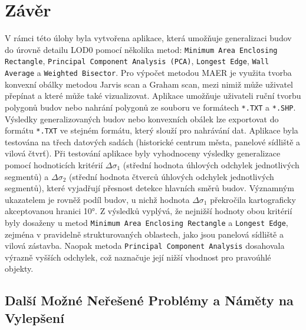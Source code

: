 \section{Závěr}

V rámci této úlohy byla vytvořena aplikace, která umožňuje generalizaci budov do úrovně detailu LOD0 pomocí několika metod: \texttt{Minimum Area Enclosing Rectangle}, \texttt{Principal Component Analysis (PCA)}, \texttt{Longest Edge}, \texttt{Wall Average} a \texttt{Weighted Bisector}. Pro výpočet metodou MAER je využita tvorba konvexní obálky metodou Jarvis scan a Graham scan, mezi nimiž může uživatel přepínat a které může také vizualizovat. Aplikace umožňuje uživateli ruční tvorbu polygonů budov nebo nahrání polygonů ze souboru ve formátech \texttt{*.TXT} a \texttt{*.SHP}. Výsledky generalizovaných budov nebo konvexních obálek lze exportovat do formátu \texttt{*.TXT} ve stejném formátu, který slouží pro nahrávání dat. Aplikace byla testována na třech datových sadách (historické centrum města, panelové sídliště a vilová čtvrť). Při testování aplikace byly vyhodnoceny výsledky generalizace pomocí hodnoticích kritérií $\Delta \sigma_1$ (střední hodnota úhlových odchylek jednotlivých segmentů) a $\Delta \sigma_2$ (střední hodnota čtverců úhlových odchylek jednotlivých segmentů), které vyjadřují přesnost detekce hlavních směrů budov. Významným ukazatelem je rovněž podíl budov, u nichž hodnota $\Delta \sigma_1$ překročila kartograficky akceptovanou hranici 10°. Z výsledků vyplývá, že nejnižší hodnoty obou kritérií byly dosaženy u metod \texttt{Minimum Area Enclosing Rectangle} a \texttt{Longest Edge}, zejména v pravidelně strukturovaných oblastech, jako jsou panelová sídliště a vilová zástavba. Naopak metoda \texttt{Principal Component Analysis} dosahovala výrazně vyšších odchylek, což naznačuje její nižší vhodnost pro pravoúhlé objekty.

\subsection{Další Možné Neřešené Problémy a Náměty na Vylepšení}


